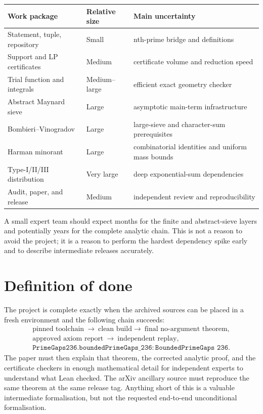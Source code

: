 \documentclass[11pt]{article}
\begin{document}
\begin{center}
\begin{tabularx}{\textwidth}{p{}p{}X}
\toprule
Work package & Relative size & Main uncertainty \\
\midrule
Statement, tuple, repository & Small & nth-prime bridge and definitions \\
Support and LP certificates & Medium & certificate volume and reduction speed \\
Trial function and integrals & Medium--large & efficient exact geometry checker \\
Abstract Maynard sieve & Large & asymptotic main-term infrastructure \\
Bombieri--Vinogradov & Large & large-sieve and character-sum prerequisites \\
Harman minorant & Large & combinatorial identities and uniform mass bounds \\
Type-I/II/III distribution & Very large & deep exponential-sum dependencies \\
Audit, paper, and release & Medium & independent review and reproducibility \\
\bottomrule
\end{tabularx}
\end{center}

A small expert team should expect months for the finite and abstract-sieve
layers and potentially years for the complete analytic chain.  This is not a
reason to avoid the project; it is a reason to perform the hardest dependency
spike early and to describe intermediate releases accurately.

\section{Definition of done}

The project is complete exactly when the archived sources can be placed in a
fresh environment and the following chain succeeds:
\[
\begin{gathered}
\text{pinned toolchain}\ \longrightarrow\ \text{clean build}
\longrightarrow\ \text{final no-argument theorem},\\
\text{approved axiom report}\ \longrightarrow\ \text{independent replay},\\[2pt]
\texttt{PrimeGaps236.boundedPrimeGaps\_236}:
\texttt{BoundedPrimeGaps 236}.
\end{gathered}
\]
The paper must then explain that theorem, the corrected analytic proof, and the
certificate checkers in enough mathematical detail for independent experts to
understand what Lean checked.  The arXiv ancillary source must reproduce the
same theorem at the same release tag.  Anything short of this is a valuable
intermediate formalisation, but not the requested end-to-end unconditional
formalisation.
\end{document}
